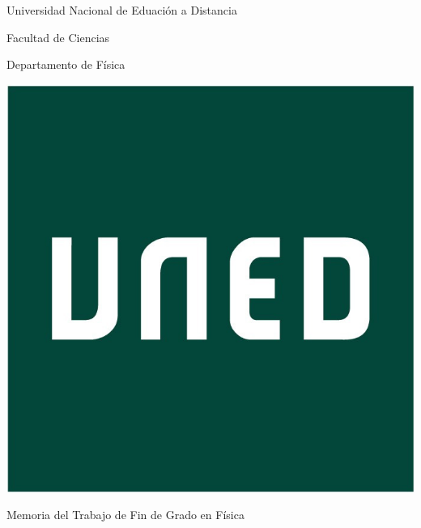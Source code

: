 %
%
%
\begin{titlepage}
    \begin{center}
        \vspace*{1cm}
 
        \huge Universidad Nacional de Eduación a Distancia

        \vspace{10mm}

        \Large Facultad de Ciencias

        \vspace{10mm}

        \Large Departamento de Física

        \vspace{10mm}
        
        \includegraphics[scale=0.25]{images/LogoUNED.jpeg}
        
        \vspace{10mm}

        \huge Memoria del Trabajo de Fin de Grado en Física


\end{center}
\end{titlepage}
